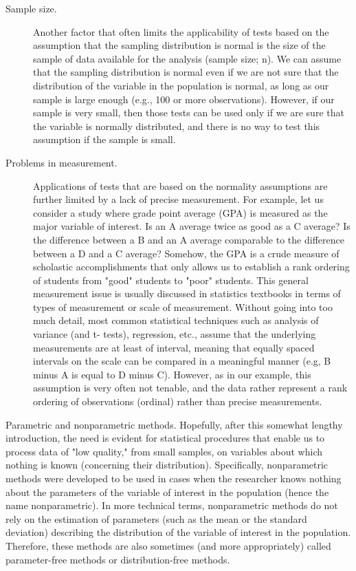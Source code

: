 
\begin{description}
\item[Sample size.] Another factor that often limits the applicability of tests based on the assumption that the sampling distribution is normal is the size of the sample of data available for the analysis (sample size; n). We can assume that the sampling distribution is normal even if we are not sure that the distribution of the variable in the population is normal, as long as our sample is large enough (e.g., 100 or more observations). However, if our sample is very small, then those tests can be used only if we are sure that the variable is normally distributed, and there is no way to test this assumption if the sample is small.

\item[Problems in measurement.] Applications of tests that are based on the normality assumptions are further limited by a lack of precise measurement. For example, let us consider a study where grade point average (GPA) is measured as the major variable of interest. Is an A average twice as good as a C average? Is the difference between a B and an A average comparable to the difference between a D and a C average? Somehow, the GPA is a crude measure of scholastic accomplishments that only allows us to establish a rank ordering of students from "good" students to "poor" students. This general measurement issue is usually discussed in statistics textbooks in terms of types of measurement or scale of measurement. Without going into too much detail, most common statistical techniques such as analysis of variance (and t- tests), regression, etc., assume that the underlying measurements are at least of interval, meaning that equally spaced intervals on the scale can be compared in a meaningful manner (e.g, B minus A is equal to D minus C). However, as in our example, this assumption is very often not tenable, and the data rather represent a rank ordering of observations (ordinal) rather than precise measurements.
\end{description}
Parametric and nonparametric methods. Hopefully, after this somewhat lengthy introduction, the need is evident for statistical procedures that enable us to process data of "low quality," from small samples, on variables about which nothing is known (concerning their distribution). Specifically, nonparametric methods were developed to be used in cases when the researcher knows nothing about the parameters of the variable of interest in the population (hence the name nonparametric). In more technical terms, nonparametric methods do not rely on the estimation of parameters (such as the mean or the standard deviation) describing the distribution of the variable of interest in the population. Therefore, these methods are also sometimes (and more appropriately) called parameter-free methods or distribution-free methods.

